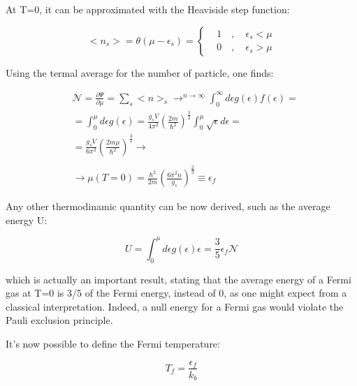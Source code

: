 \documentclass{article}
\begin{document}
At T=0, it can be approximated with the Heaviside step function:

\begin{equation}
    <n_s>=\theta(\mu-\epsilon_s)=
    \left\{
    \begin{aligned}
         & 1 \quad , \quad \epsilon_s<\mu \\
         & 0 \quad , \quad \epsilon_s>\mu
    \end{aligned}
    \right.
\end{equation}

Using the termal average for the number of particle, one finds:

\begin{equation}
    \begin{aligned}
         & \mathcal{N}=\frac{\partial\Psi}{\partial \mu}=\sum_s <n>_s\rightarrow^{n\rightarrow\infty} \int_{0}^{\infty} d\epsilon g(\epsilon)f(\epsilon)= \\
         & =\int_{0}^{\mu} d\epsilon g(\epsilon)=\frac{g_sV}{4\pi^2}\left(\frac{2m}{\hbar^2}\right)^{\frac{3}{2}}\int_{0}^{\mu}\sqrt{\epsilon}d\epsilon=  \\
         & = \frac{g_sV}{6\pi^2}\left(\frac{2m\mu}{\hbar^2}\right)^{\frac{3}{2}}\rightarrow                                                               \\                                                 \\
         & \rightarrow \mu(T=0)=\frac{\hbar^2}{2m}\left(\frac{6\pi^2n}{g_s}\right)^{\frac{2}{3}}\equiv \epsilon_f
    \end{aligned}
\end{equation}

Any other thermodinamic quantity can be now derived, such as the average energy U:

\begin{equation}
    U=\int_{0}^{\mu}d\epsilon g(\epsilon)\epsilon=\frac{3}{5}\epsilon_f\mathcal{N}
\end{equation}

which is actually an important result, stating that the average energy of a Fermi gas at T=0 is 3/5 of the Fermi energy, instead
of 0, as one might expect from a classical interpretation. Indeed, a null energy for a Fermi gas
would violate the Pauli exclusion principle.

It's now possible to define the Fermi temperature:

\begin{equation}
    T_f=\frac{\epsilon_f}{k_b}
\end{equation}
\end{document}

